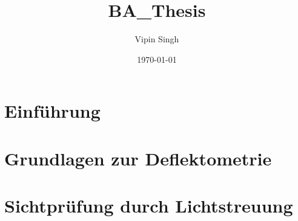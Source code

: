 \documentclass[ngerman,11pt,a4paper]{report}
\author{Vipin Singh}
\title{BA_Thesis}
\date{\today}
\begin{document}
	
	    
	\begin{abstract}
		\FloatBarrier %
		\setcounter{page}{2}
		
	\end{abstract}
	    
	{
		\FloatBarrier %
		\setcounter{page}{3}
		\tableofcontents
	}
	    
	{
		\FloatBarrier %
		\newpage
		\listoffigures
	}
	
	{
		\FloatBarrier %
		\newpage
		\printglossary[title=Abkürzungsverzeichnis, type=\acronymtype]
		
	}
	
	{
		\FloatBarrier %
		\chapter{Einführung}
		\label{chp:einfuehrung}
		
	}
	
	{
		\FloatBarrier %
		\chapter{Grundlagen zur Deflektometrie}
		\label{chp:grundlagenDeflektometrie}
		
	}
	
	{
		\FloatBarrier %
		\chapter{Sichtprüfung durch Lichtstreuung}
		\label{chp:sichtpruefungDurchLichtstreuung}
		
	}
	
\end{document}

